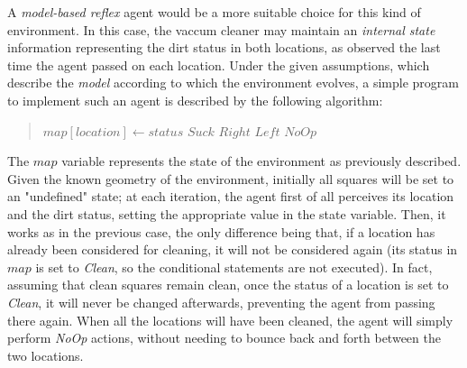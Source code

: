 \documentclass[letterpaper,headings=standardclasses]{scrartcl}
\begin{document}
A \emph{model-based reflex} agent would be a more suitable choice for this kind of environment. In this case, the vaccum cleaner may maintain an \emph{internal state} information representing the dirt status in both locations, as observed the last time the agent passed on each location. Under the given assumptions, which describe the \emph{model} according to which the environment evolves, a simple program to implement such an agent is described by the following algorithm:

\begin{quote}
\begin{algorithmic}

  \State $map[location] \gets status$
   \Return $Suck$
   \Return $Right$
   \Return $Left$
  \Else{} \Return $NoOp$
  \EndIf
\EndFunction

\end{algorithmic}
\end{quote}

The $map$ variable represents the state of the environment as previously described. Given the known geometry of the environment, initially all squares will be set to an "undefined" state; at each iteration, the agent first of all perceives its location and the dirt status, setting the appropriate value in the state variable. Then, it works as in the previous case, the only difference being that, if a location has already been considered for cleaning, it will not be considered again (its status in $map$ is set to \emph{Clean}, so the conditional statements are not executed). In fact, assuming that clean squares remain clean, once the status of a location is set to \emph{Clean}, it will never be changed afterwards, preventing the agent from passing there again. When all the locations will have been cleaned, the agent will simply perform \emph{NoOp} actions, without needing to bounce back and forth between the two locations.
\end{document}
